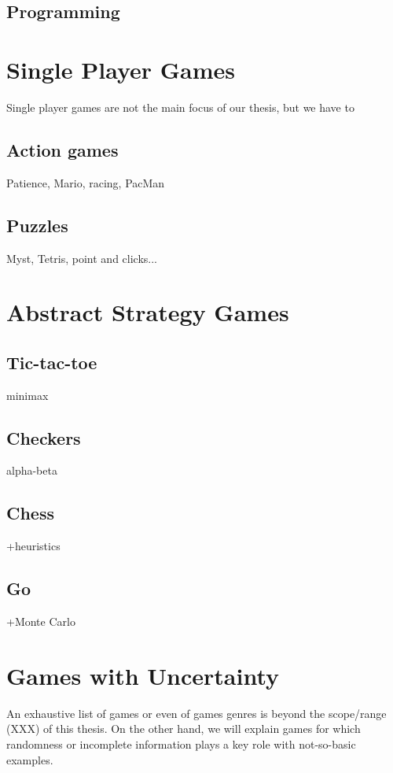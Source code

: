 
\subsection{Programming}

\section{Single Player Games}

Single player games are not the main focus of our thesis, but we have to 

\subsection{Action games}


Patience, Mario, racing, PacMan
\subsection{Puzzles}
Myst, Tetris, point and clicks...

\section{Abstract Strategy Games}
\subsection{Tic-tac-toe}
minimax
\subsection{Checkers}
alpha-beta
\subsection{Chess}
+heuristics
\subsection{Go}
+Monte Carlo

\section{Games with Uncertainty}
An exhaustive list of games or even of games genres is beyond the scope/range (XXX) of this thesis. On the other hand, we will explain games for which randomness or incomplete information plays a key role with not-so-basic examples.

